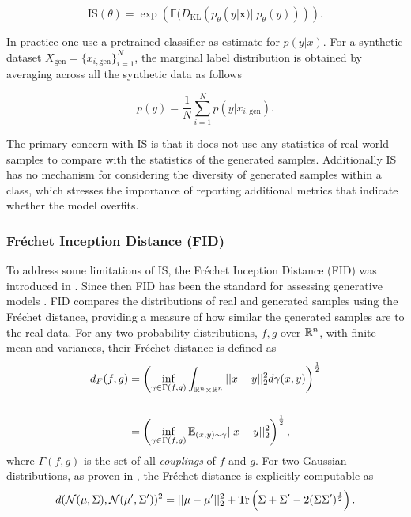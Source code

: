 \documentclass[../../thesis.tex]{subfiles}
\begin{document}
\begin{equation}
    \label{IS}
    {\text{IS}}(\theta) = \exp\left( \mathbb{E}(D_{\text{KL}}(p_\theta(y|\mathbf{x}) || p_\theta(y))) \right).
\end{equation}


In practice one use a pretrained classifier as estimate for $p(y|x)$. For a synthetic dataset $X_{\text{gen}} = \{x_{i,\text{gen}}\}_{i=1}^N$, the marginal label distribution is obtained by averaging across all the synthetic data as follows

\[
    p(y) = \frac{1}{N} \sum_{i=1}^N p(y |x_{i,\text{gen}}).
\]

The primary concern with IS is that it does not use any statistics of real world samples to compare with the statistics of the generated samples. Additionally IS has no mechanism for considering the diversity of generated samples within a class, which stresses the importance of reporting additional metrics that indicate whether the model overfits. 

\subsubsection{Fréchet Inception Distance (FID)}
To address some limitations of IS, the Fréchet Inception Distance (FID) was introduced in \cite{heusel2018gans}. Since then FID has been the standard for assessing generative models \cite{borji2021pros}. FID compares the distributions of real and generated samples using the Fréchet distance, providing a measure of how similar the generated samples are to the real data. For any two probability distributions, $f,g$ over $\mathbb{R}^n$, with finite mean and variances, their Fréchet distance is defined as 
\begin{equation}
    \begin{aligned}
        d_F(f,g) &= \left(\inf_{\gamma \in \Gamma(f,g)} \int_{\mathbb{R}^n\times\mathbb{R}^n}||x-y||_2^2d\gamma(x,y) \right)^{\frac{1}{2}}\\\\
            &= \left(\inf_{\gamma \in \Gamma(f,g)} \mathbb{E}_{(x,y)\sim \gamma} ||x-y||_2^2\right)^{\frac{1}{2}},
    \end{aligned}
\end{equation}
where $\Gamma(f,g)$ is the set of all \textit{couplings} of $f$ and $g$. For two Gaussian distributions, as proven in  \cite{DOWSON1982450}, the Fréchet distance is explicitly computable as
\begin{equation}
    \label{eq:FID Gaussian}
    d(\mathcal{N}(\mu,\Sigma),\mathcal{N}(\mu',\Sigma'))^2 = ||\mu-\mu'||_2^2 + \operatorname{Tr} \left( \Sigma + \Sigma' - 2(\Sigma\Sigma')^{\frac12}\right).
\end{equation}
\end{document}
